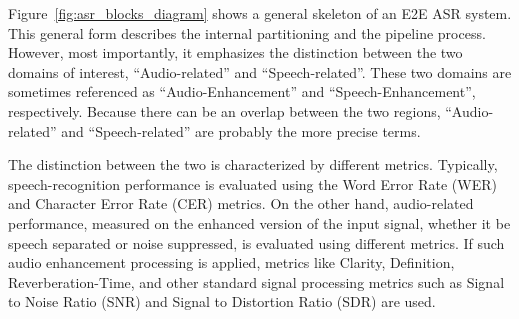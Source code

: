 Figure~\ref{fig:asr_blocks_diagram} shows 
a general skeleton of
an E2E ASR system. This general form describes the
internal partitioning and the pipeline process.
However, most importantly, it emphasizes
the distinction between the two domains of interest,
``Audio-related'' and ``Speech-related''.
These two domains are sometimes referenced
as ``Audio-Enhancement'' and ``Speech-Enhancement'', respectively.
Because there can be an overlap between
the two regions, ``Audio-related'' 
and ``Speech-related'' are probably the more precise terms.



The distinction between the two is characterized
by different metrics.
Typically, speech-recognition performance is evaluated
using the Word Error Rate (WER) and
Character Error Rate (CER) metrics.
On the other hand, audio-related performance,
measured on the enhanced version of the input signal,
whether it be speech separated or noise suppressed,
is evaluated using different metrics.
If such audio enhancement processing is applied,
metrics like Clarity\cite{c50}, Definition\cite{c50d50t50},
Reverberation-Time\cite{c50d50t50}, and other standard signal processing metrics
such as Signal to Noise Ratio (SNR) 
and Signal to Distortion Ratio (SDR) are used.






